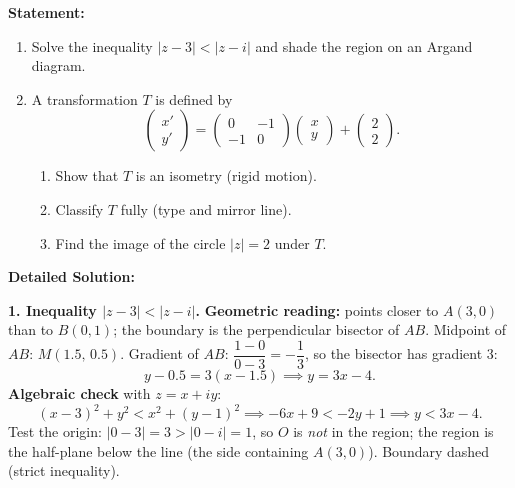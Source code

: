 \documentclass[11pt]{article}
\begin{document}
\begin{exoresolu}
\textbf{Statement:}
\begin{enumerate}
    \item Solve the inequality $|z - 3| < |z - i|$ and shade the region on an Argand diagram.
    \item A transformation $T$ is defined by
    \[
    \begin{pmatrix} x' \\ y' \end{pmatrix} = \begin{pmatrix} 0 & -1 \\ -1 & 0 \end{pmatrix} \begin{pmatrix} x \\ y \end{pmatrix} + \begin{pmatrix} 2 \\ 2 \end{pmatrix}.
    \]
    \begin{enumerate}
        \item Show that $T$ is an isometry (rigid motion).
        \item Classify $T$ fully (type and mirror line).
        \item Find the image of the circle $|z| = 2$ under $T$.
    \end{enumerate}
\end{enumerate}

\tcblower
\textbf{Detailed Solution:}

\textbf{1. Inequality $|z-3| < |z-i|$.}
\textbf{Geometric reading:} points closer to $A(3,0)$ than to $B(0,1)$; the boundary is the perpendicular bisector of $AB$.
Midpoint of $AB$: $M(1.5,\,0.5)$. Gradient of $AB$: $\dfrac{1-0}{0-3} = -\dfrac13$, so the bisector has gradient $3$:
\[
y - 0.5 = 3(x - 1.5) \implies y = 3x - 4.
\]
\textbf{Algebraic check} with $z=x+iy$:
\[
(x-3)^2 + y^2 < x^2 + (y-1)^2
\implies -6x + 9 < -2y + 1
\implies \boxed{y < 3x - 4}.
\]
Test the origin: $|0-3|=3 > |0-i|=1$, so $O$ is \emph{not} in the region; the region is the half-plane below the line (the side containing $A(3,0)$). Boundary dashed (strict inequality).


\end{exoresolu}
\end{document}
